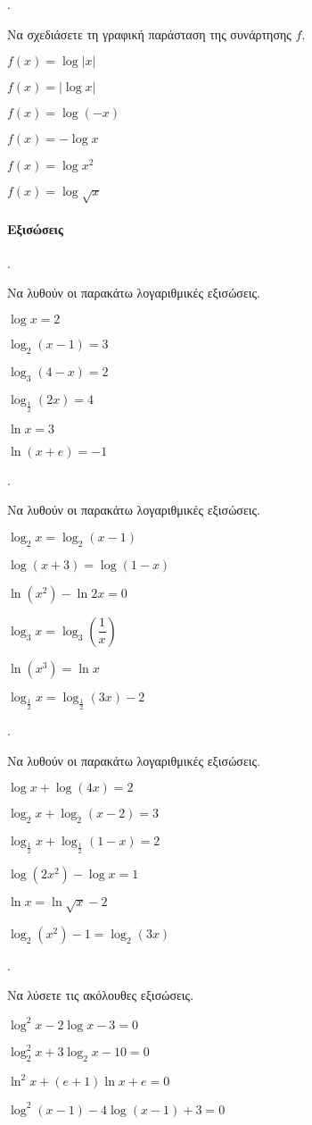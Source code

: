 \documentclass[11pt,a4paper,twocolumn]{article}
\newcounter{askhsh}
\newcommand{\askhsh}{\large\theaskhsh.\ \addtocounter{askhsh}{1}}
\begin{document}
\askhsh Να σχεδιάσετε τη γραφική παράσταση της συνάρτησης $f$.
\begin{multicols}{2}
\begin{alist}
\item $f(x)=\log{|x|}$
\item $f(x)=|\log{x}|$
\item $f(x)=\log{(-x)}$
\item $f(x)=-\log{x}$
\item $f(x)=\log{x^2}$
\item $f(x)=\log{\sqrt{x}}$
\end{alist}
\end{multicols}
\paragraph{Εξισώσεις}
\askhsh Να λυθούν οι παρακάτω λογαριθμικές εξισώσεις.
\begin{multicols}{2}
\begin{alist}
\item $\log{x}=2$
\item $\log_2{(x-1)}=3$
\item $\log_3{(4-x)}=2$
\item $\log_{\frac{1}{2}}{(2x)}=4$
\item $\ln{x}=3$
\item $\ln{(x+e)}=-1$
\end{alist}
\end{multicols}
\askhsh Να λυθούν οι παρακάτω λογαριθμικές εξισώσεις.
\begin{alist}
\item $\log_2{x}=\log_2{(x-1)}$
\item $\log{(x+3)}=\log{(1-x)}$
\item $\ln{(x^2)}-\ln{2x}=0$
\item $\log_3{x}=\log_3{\left(\dfrac{1}{x}\right)}$
\item $\ln{(x^3)}=\ln{x}$
\item $\log_{\frac{1}{2}}{x}=\log_{\frac{1}{2}}{(3x)}-2$
\end{alist}
\askhsh Να λυθούν οι παρακάτω λογαριθμικές εξισώσεις.
\begin{alist}
\item $\log{x}+\log{(4x)}=2$
\item $\log_2{x}+\log_2{(x-2)}=3$
\item $\log_{\frac{1}{2}}{x}+\log_{\frac{1}{2}}{(1-x)}=2$
\item $\log{(2x^2)}-\log{x}=1$
\item $\ln{x}=\ln{\sqrt{x}}-2$
\item $\log_2{(x^2)}-1=\log_2{(3x)}$
\end{alist}
\askhsh Να λύσετε τις ακόλουθες εξισώσεις.
\begin{alist}
\item $\log^2{x}-2\log{x}-3=0$
\item $\log_2^2{x}+3\log_2{x}-10=0$
\item $\ln^2{x}+(e+1)\ln{x}+e=0$
\item $\log^2{(x-1)}-4\log{(x-1)}+3=0$
\end{alist}
\end{document}
